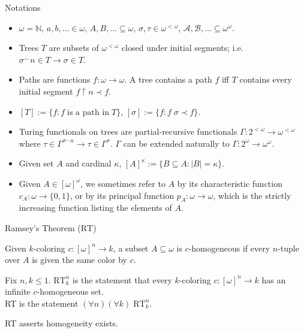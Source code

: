 \begin{frame}{Notations}
  \begin{itemize}
    \item $\omega=\mathbb{N}$, $a,b,\ldots\in\omega$,
      $A,B,\ldots\subseteq\omega$, $\sigma,\tau\in\omega^{<\omega}$,
      $\mathcal{A},\mathcal{B},\ldots\subseteq\omega^\omega$.
    \item Trees $T$ are subsets of $\omega^{<\omega}$ closed under initial
      segments; i.e. $\sigma^{\frown}n\in T \rightarrow \sigma\in T$.
    \item Paths are functions $f:\omega\rightarrow\omega$. A tree contains
      a path $f$ iff $T$ contains every initial segment $f\restriction n
      \prec f$.
    \item $[T] :=\{f:f\; \text{is a path in}\; T\}$, $[\sigma]:=\{f:f\;
      \sigma\prec f\}$.
    \item Turing functionals on trees are partial-recursive functionals
      $\Gamma:2^{<\omega}\rightarrow\omega^{<\omega}$ where
      $\tau\in\Gamma^{\sigma^\frown n} \rightarrow
      \tau\in\Gamma^{\sigma}$. $\Gamma$ can be extended naturally to
      $\Gamma:2^\omega\rightarrow\omega^{\omega}$.
    \item Given set $A$ and cardinal $\kappa$, $[A]^\kappa
      :=\{B\subseteq A: |B|=\kappa\}$.
    \item Given $A\in[\omega]^\omega$, we sometimes refer to $A$ by its
      characteristic function $c_A:\omega\rightarrow\{0,1\}$, or by its
      principal function $p_A:\omega\rightarrow\omega$, which is the
      strictly increasing function listing the elements of $A$.
  \end{itemize}
\end{frame}

\begin{frame}{Ramsey's Theorem ($\text{RT}$)}
  \begin{define*}[$c$-homogeneous]
    Given $k$-coloring $c:[\omega]^n\rightarrow k$, a subset
    $A\subseteq\omega$ is $c$-homogeneous if every $n$-tuple over $A$ is
    given the same color by $c$.
  \end{define*}

  \vspace{1em}
  \begin{thm*}
    Fix $n,k\leq1$. $\text{RT}_k^n$ is the statement that every $k$-coloring
    $c:[\omega]^n\rightarrow k$ has an infinite $c$-homogeneous set.\\
    RT is the statement $(\forall n)(\forall k)\; \text{RT}_k^n$.
  \end{thm*}

  \vspace{1em}
  RT asserts homogeneity exists.
\end{frame}

